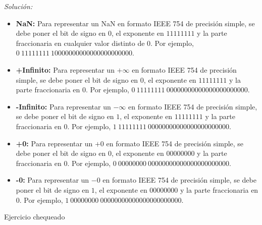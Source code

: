 \documentclass{article}
\newcounter{ejemplo}[section]
\newenvironment{solution}
    {\textit{Solución:}}
    {}
\begin{document}
\begin{solution}
    \begin{itemize}
        \item \textbf{NaN:} Para representar un NaN en formato IEEE 754 de precisión simple, se debe poner el bit de signo en $0$, el exponente en $11111111$ y la parte fraccionaria en cualquier valor distinto de $0$. Por ejemplo, $0 \ 11111111 \ 10000000000000000000000$.
        \item \textbf{+Infinito:} Para representar un $+\infty$ en formato IEEE 754 de precisión simple, se debe poner el bit de signo en $0$, el exponente en $11111111$ y la parte fraccionaria en $0$. Por ejemplo, $0 \ 11111111 \ 00000000000000000000000$.
        \item \textbf{-Infinito:} Para representar un $-\infty$ en formato IEEE 754 de precisión simple, se debe poner el bit de signo en $1$, el exponente en $11111111$ y la parte fraccionaria en $0$. Por ejemplo, $1 \ 11111111 \ 00000000000000000000000$.
        \item \textbf{+0:} Para representar un $+0$ en formato IEEE 754 de precisión simple, se debe poner el bit de signo en $0$, el exponente en $00000000$ y la parte fraccionaria en $0$. Por ejemplo, $0 \ 00000000 \ 00000000000000000000000$.
        \item \textbf{-0:} Para representar un $-0$ en formato IEEE 754 de precisión simple, se debe poner el bit de signo en $1$, el exponente en $00000000$ y la parte fraccionaria en $0$. Por ejemplo, $1 \ 00000000 \ 00000000000000000000000$.
    \end{itemize}
\end{solution}

{\color{green} Ejercicio chequeado}
\end{document}
